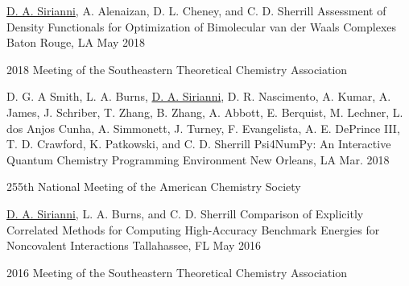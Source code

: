 \begin{cventries}


  \cventry
    {\underline{D. A. Sirianni}, A. Alenaizan, D. L. Cheney, and C. D. Sherrill} %
    {Assessment of Density Functionals for Optimization of Bimolecular van der Waals Complexes} %
    {Baton Rouge, LA} %
    {May 2018} %
    {%
    \begin{cvitems}
    \item[] 2018 Meeting of the Southeastern Theoretical Chemistry Association %
    \end{cvitems}
    }


  \cventry
    {D. G. A Smith, L. A. Burns, \underline{D. A. Sirianni}, D. R. Nascimento, A. Kumar, A. James, J. Schriber, T. Zhang, B. Zhang, A. Abbott, E. Berquist, M. Lechner, L. dos Anjos Cunha, A. Simmonett, J. Turney, F. Evangelista, A. E. DePrince III, T. D. Crawford, K. Patkowski, and C. D. Sherrill} %
    {{\sc Psi4NumPy}: An Interactive Quantum Chemistry Programming Environment} %
    {New Orleans, LA} %
    {Mar. 2018} %
    {%
    \begin{cvitems}
    \item[] 255th National Meeting of the American Chemistry Society %
    \end{cvitems}
    }


  \cventry
    {\underline{D. A. Sirianni}, L. A. Burns, and C. D. Sherrill} %
    {Comparison of Explicitly Correlated Methods for Computing
High-Accuracy Benchmark Energies for Noncovalent Interactions} %
    {Tallahassee, FL} %
    {May 2016} %
    {%
    \begin{cvitems}
    \item[] 2016 Meeting of the Southeastern Theoretical Chemistry Association %
    \end{cvitems}
    }


\end{cventries}
